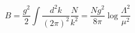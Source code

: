 \begin{equation}
B=\frac{g^2}{2}\int\frac{d^2k}{(2\pi)^2}\frac{N}{k^2}=\frac{Ng^2}{8\pi}\log{\frac{\Lambda^2}{\mu^2}}\label{SNB1}
\end{equation}

